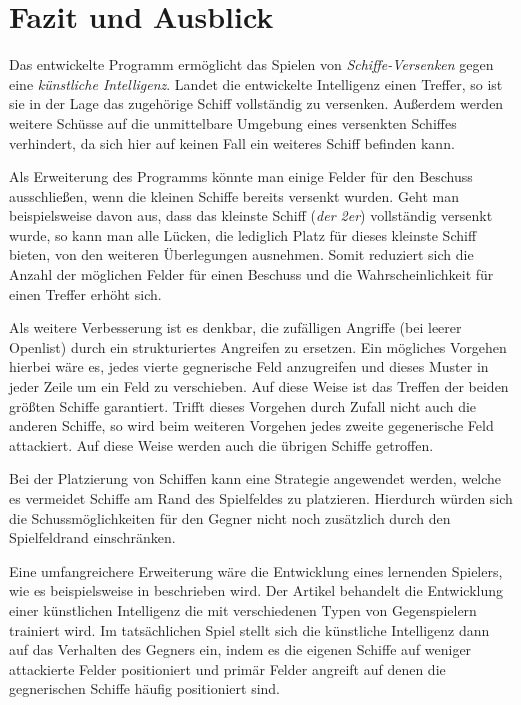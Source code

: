 \section{Fazit und Ausblick} \label{sec:Ausblick}
	Das entwickelte Programm ermöglicht das Spielen von \textit{Schiffe-Versenken} gegen eine \textit{künstliche Intelligenz}. 
	Landet die entwickelte Intelligenz einen Treffer, so ist sie in der Lage das zugehörige Schiff vollständig zu versenken. 
	Außerdem werden weitere Schüsse auf die unmittelbare Umgebung eines versenkten Schiffes verhindert, da sich hier auf keinen Fall ein
	weiteres Schiff befinden kann.
	
	Als Erweiterung des Programms könnte man einige Felder für den Beschuss ausschließen, wenn die kleinen Schiffe bereits versenkt wurden.
	Geht man beispielsweise davon aus, dass das kleinste Schiff (\textit{der 2er}) vollständig versenkt wurde, so kann man alle 
	Lücken, die lediglich Platz für dieses kleinste Schiff bieten, von den weiteren Überlegungen ausnehmen. Somit reduziert sich die 
	Anzahl der möglichen Felder für einen Beschuss und die Wahrscheinlichkeit für einen Treffer erhöht sich.

	Als weitere Verbesserung ist es denkbar, die zufälligen Angriffe (bei leerer Openlist) durch ein strukturiertes Angreifen zu ersetzen.
	Ein mögliches Vorgehen hierbei wäre es, jedes vierte gegnerische Feld anzugreifen und dieses Muster in jeder Zeile um ein Feld zu verschieben.  
	Auf diese Weise ist das Treffen der beiden größten Schiffe garantiert. Trifft dieses Vorgehen durch Zufall nicht auch die anderen 
	Schiffe, so wird beim weiteren Vorgehen jedes zweite gegenerische Feld attackiert. Auf diese Weise werden auch die übrigen Schiffe getroffen.
	
	Bei der Platzierung von Schiffen kann eine Strategie angewendet werden, welche es vermeidet Schiffe am Rand des Spielfeldes zu platzieren. 
	Hierdurch würden sich die Schussmöglichkeiten für den Gegner nicht noch zusätzlich durch den Spielfeldrand einschränken.
	
	Eine umfangreichere Erweiterung wäre die Entwicklung eines lernenden Spielers, wie es beispielsweise in \cite{intelligentesversenken}
	beschrieben wird. Der Artikel behandelt die Entwicklung einer künstlichen Intelligenz die mit verschiedenen Typen von Gegenspielern
	trainiert wird. Im tatsächlichen Spiel stellt sich die künstliche Intelligenz dann auf das Verhalten des Gegners ein, indem es die
	eigenen Schiffe auf weniger attackierte Felder positioniert und primär Felder angreift auf denen die 
	gegnerischen Schiffe häufig positioniert sind.


